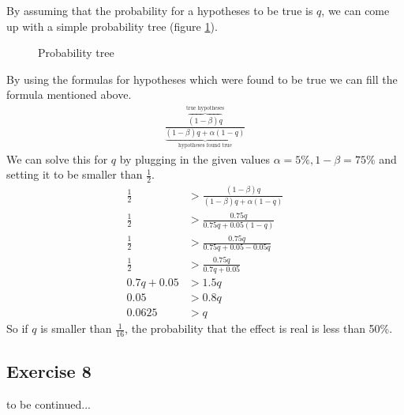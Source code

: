 By assuming that the probability for a hypotheses to be true is $q$, we can come up with a simple probability tree (figure \ref{fig:2014-05-30_ex6tree}).

\begin{figure}[!ht]
  
  \caption{Probability tree}
  \label{fig:2014-05-30_ex6tree}
\end{figure}

By using the formulas for hypotheses which were found to be true we can fill the formula mentioned above.
\begin{align*}
\frac{\overbrace{(1-\beta)q}^\text{true hypotheses}}{\underbrace{(1-\beta)q+\alpha(1-q)}_\text{hypotheses found true}}
\end{align*}
We can solve this for $q$ by plugging in the given values $\alpha=5\%,1-\beta=75\%$ and setting it to be smaller than $\frac{1}{2}$.
\begin{align*}
\frac{1}{2}&>\frac{(1-\beta)q}{(1-\beta)q+\alpha(1-q)} \\
\frac{1}{2}&>\frac{0.75q}{0.75q+0.05(1-q)} \\
\frac{1}{2}&>\frac{0.75q}{0.75q+0.05-0.05q} \\
\frac{1}{2}&>\frac{0.75q}{0.7q+0.05} \\
0.7q+0.05  &>1.5q \\
0.05       &>0.8q \\
0.0625     &>q
\end{align*}
So if $q$ is smaller than $\frac{1}{16}$, the probability that the effect is real is less than 50\%.


\subsection*{Exercise 8}
to be continued...
